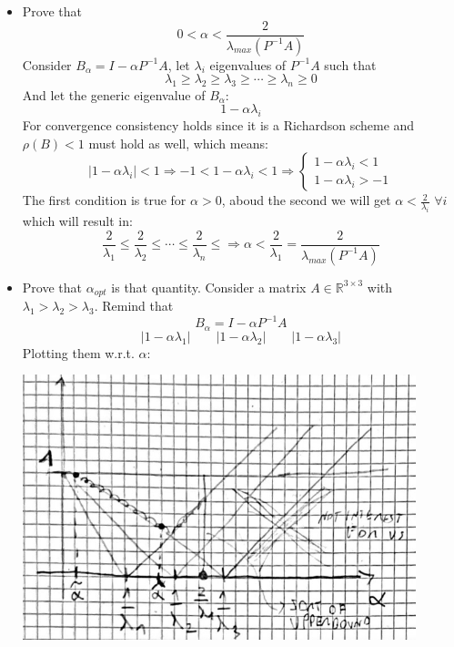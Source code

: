     \begin{itemize}
        \item Prove that
        $$
        0<\alpha<\frac{2}{\lambda_{max}(P^{-1}A)}
        $$
        Consider $B_\alpha=I-\alpha P^{-1}A$, let $\lambda_i$ eigenvalues of $P^{-1}A$ such that $$\lambda_1\geq\lambda_2\geq\lambda_3\geq\cdots\geq\lambda_n\geq 0$$
        And let the generic eigenvalue of $B_\alpha$:
        $$
        1-\alpha\lambda_i
        $$
        For convergence consistency holds since it is a Richardson scheme and $\rho(B)<1$ must hold as well, which means:
        $$
        |1-\alpha\lambda_i|<1\Rightarrow
        -1<1-\alpha\lambda_i<1\Rightarrow
        \begin{cases}
            1-\alpha\lambda_i<1\\
            1-\alpha\lambda_i>-1
        \end{cases}
        $$
        The first condition is true for $\alpha >0$, aboud the second we will get $\alpha<\frac{2}{\lambda_i}\,\,\forall i$ which will result in:
        $$
        \frac{2}{\lambda_1}\leq
        \frac{2}{\lambda_2}\leq
        \cdots\leq
        \frac{2}{\lambda_n}\leq
        \Rightarrow \alpha<\frac{2}{\lambda_1}=\frac{2}{\lambda_{max}(P^{-1}A)}
        $$
        \item Prove that $\alpha_{opt}$ is that quantity. Consider a matrix $A\in\mathbb{R}^{3\times 3}$ with $\lambda_1>\lambda_2>\lambda_3$. Remind that 
        $$
        B_\alpha=I-\alpha P^{-1}A
        $$
        $$
        |1-\alpha\lambda_1|\qquad
        |1-\alpha\lambda_2|\qquad
        |1-\alpha\lambda_3|
        $$
        Plotting them w.r.t. $\alpha$:
        \begin{center}
            \includegraphics[width=0.9\textwidth]{images/20221118-1.png}
        \end{center}

\end{itemize}
